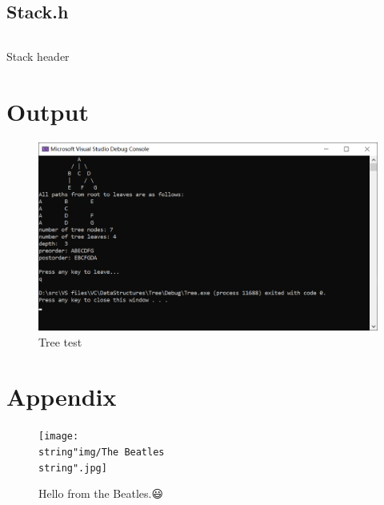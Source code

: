 \documentclass{article}
\begin{document}
	\subsection{Stack.h}	
	\begin{longlisting}
		\inputminted{c++}{src/Stack.h}
		\caption{Stack header}
		\label{Stack.h}
	\end{longlisting}
	
	\section{Output}
	\begin{figure}[!hb]
		\centering
		\includegraphics[width=0.79\linewidth]{img/tree_test}
		\caption{Tree test}
		\label{fig:treetestwin10}
	\end{figure}
	
	\clearpage
	\section{Appendix}
	\begin{figure}[!hb]
		\centering
		\texttt{[image: \\string"img/The 
			Beatles\\string".jpg]}
		\caption*{Hello from the Beatles.😃}
		\label{fig:the-beatles}
	\end{figure}
	
\end{document}
